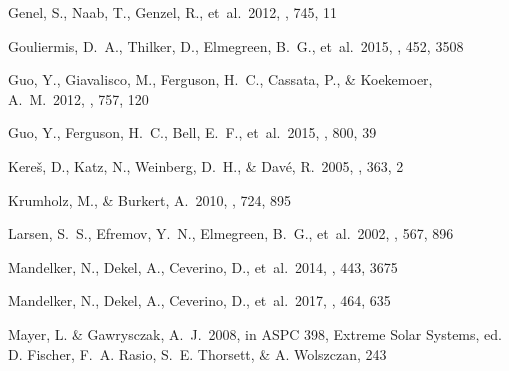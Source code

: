 \documentclass[twocolumn]{aastex61}
\begin{document}
\begin{thebibliography}{}
Genel, S., Naab, T., Genzel, R., et~al.\ 2012, \apj, 745, 11




Gouliermis, D.~A., Thilker, D., Elmegreen, B.~G., et~al.\ 2015, \mnras, 452, 3508


Guo, Y., Giavalisco, M., Ferguson, H.~C., Cassata, P., \& Koekemoer, A.~M.\ 2012, \apj, 757, 120

Guo, Y., Ferguson, H.~C., Bell, E.~F., et~al.\ 2015, \apj, 800, 39


Kere\v s, D., Katz, N., Weinberg, D.~H., \& Dav\'e, R.\ 2005, \mnras, 363, 2

Krumholz, M., \& Burkert, A.\ 2010, \apj, 724, 895

Larsen, S.~S., Efremov, Y.~N., Elmegreen, B.~G., et~al.\ 2002, \apj, 567, 896



Mandelker, N., Dekel, A., Ceverino, D., et~al.\ 2014, \mnras, 443, 3675

Mandelker, N., Dekel, A., Ceverino, D., et~al.\ 2017, \mnras, 464, 635

Mayer, L. \& Gawrysczak, A.~J.\ 2008, in ASPC 398, Extreme Solar Systems, ed. D. Fischer, F.~A. Rasio, S.~E. Thorsett, \& A. Wolszczan, 243


\end{thebibliography}
\end{document}

